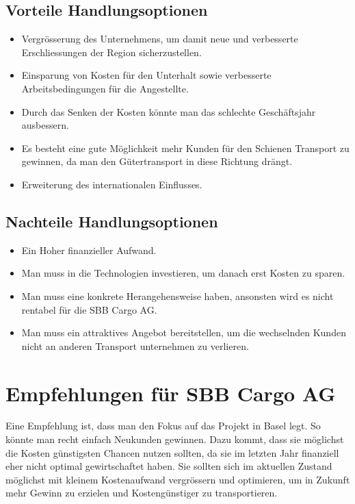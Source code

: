 \documentclass{article}
\begin{document}
\subsection{Vorteile Handlungsoptionen}
\begin{itemize}
    \item Vergrösserung des Unternehmens, um damit neue und verbesserte Erschliessungen der Region sicherzustellen. 
    \item Einsparung von Kosten für den Unterhalt sowie verbesserte Arbeitsbedingungen für die Angestellte. 
    \item Durch das Senken der Kosten könnte man das schlechte Geschäftsjahr ausbessern. 
    \item Es besteht eine gute Möglichkeit mehr Kunden für den Schienen Transport zu gewinnen, da man den Gütertransport in diese Richtung drängt. 
    \item Erweiterung des internationalen Einflusses. 
\end{itemize}

\subsection{Nachteile Handlungsoptionen}
\begin{itemize}
    \item Ein Hoher finanzieller Aufwand.
    \item Man muss in die Technologien investieren, um danach erst Kosten zu sparen. 
    \item Man muss eine konkrete Herangehensweise haben, ansonsten wird es nicht rentabel für die SBB Cargo AG.
    \item Man muss ein attraktives Angebot bereitstellen, um die wechselnden Kunden nicht an anderen Transport unternehmen zu verlieren.
\end{itemize}

\section{Empfehlungen für SBB Cargo AG}

Eine Empfehlung ist, dass man den Fokus auf das Projekt in Basel legt. So könnte man recht einfach Neukunden gewinnen.
Dazu kommt, dass sie möglichst die Kosten günstigsten Chancen nutzen sollten, da sie im letzten Jahr finanziell eher nicht optimal gewirtschaftet haben.
Sie sollten sich im aktuellen Zustand möglichst mit kleinem Kostenaufwand vergrössern und optimieren, um in Zukunft mehr Gewinn zu erzielen und Kostengünstiger zu transportieren.
\end{document}
